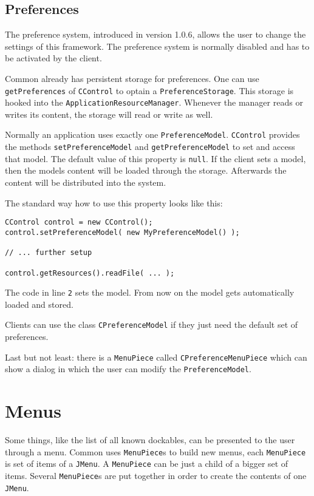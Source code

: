 \documentclass[a4paper,10pt]{article}
\newcommand{\src}[1]{\lstinline[basicstyle=\ttfamily]|#1|}
\begin{document}
\subsection{Preferences}
The preference system, introduced in version 1.0.6, allows the user to change the settings of this framework. The preference system is normally disabled and has to be activated by the client.

Common already has persistent storage for preferences. One can use \\\src{getPreferences} of \src{CControl} to optain a \src{PreferenceStorage}. This storage is hooked into the \src{ApplicationResourceManager}. Whenever the manager reads or writes its content, the storage will read or write as well.

Normally an application uses exactly one \src{PreferenceModel}. \src{CControl} provides the methods \src{setPreferenceModel} and \src{getPreferenceModel} to set and access that model. The default value of this property is \src{null}. If the client sets a model, then the models content will be loaded through the storage. Afterwards the content will be distributed into the system.

The standard way how to use this property looks like this:
\begin{lstlisting}
CControl control = new CControl();
control.setPreferenceModel( new MyPreferenceModel() );

// ... further setup

control.getResources().readFile( ... );
\end{lstlisting}
The code in line \src{2} sets the model. From now on the model gets automatically loaded and stored.

Clients can use the class \src{CPreferenceModel} if they just need the default set of preferences.

Last but not least: there is a \src{MenuPiece} called \src{CPreferenceMenuPiece} which can show a dialog in which the user can modify the \src{PreferenceModel}.

\section{Menus}
Some things, like the list of all known dockables, can be presented to the user through a menu. Common uses \src{MenuPiece}s to build new menus, each \src{MenuPiece} is set of items of a \src{JMenu}. A \src{MenuPiece} can be just a child of a bigger set of items. Several \src{MenuPiece}s are put together in order to create the contents of one \src{JMenu}.
\end{document}
